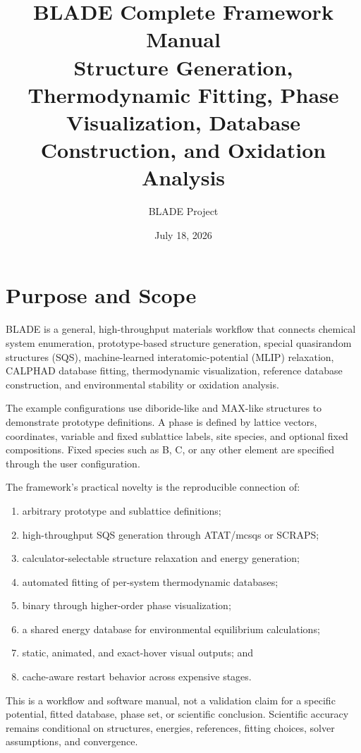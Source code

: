 \documentclass[11pt,letterpaper]{article}
\title{\textbf{BLADE Complete Framework Manual}\\
\large Structure Generation, Thermodynamic Fitting, Phase Visualization,
Database Construction, and Oxidation Analysis}
\author{BLADE Project}
\date{July 18, 2026}
\begin{document}
\maketitle
\tableofcontents
\newpage

\section{Purpose and Scope}

BLADE is a general, high-throughput materials workflow that connects chemical
system enumeration, prototype-based structure generation, special
quasirandom structures (SQS), machine-learned interatomic-potential (MLIP)
relaxation, CALPHAD database fitting, thermodynamic visualization, reference
database construction, and environmental stability or oxidation analysis.

The example configurations use diboride-like and MAX-like structures to
demonstrate prototype definitions. A phase is defined by lattice vectors,
coordinates, variable and fixed sublattice labels, site species, and optional
fixed compositions. Fixed species such as B, C, or any other element are
specified through the user configuration.

The framework's practical novelty is the reproducible connection of:
\begin{enumerate}
  \item arbitrary prototype and sublattice definitions;
  \item high-throughput SQS generation through ATAT/mcsqs or SCRAPS;
  \item calculator-selectable structure relaxation and energy generation;
  \item automated fitting of per-system thermodynamic databases;
  \item binary through higher-order phase visualization;
  \item a shared energy database for environmental equilibrium calculations;
  \item static, animated, and exact-hover visual outputs; and
  \item cache-aware restart behavior across expensive stages.
\end{enumerate}

This is a workflow and software manual, not a validation claim for a specific
potential, fitted database, phase set, or scientific conclusion. Scientific
accuracy remains conditional on structures, energies, references, fitting
choices, solver assumptions, and convergence.
\end{document}
